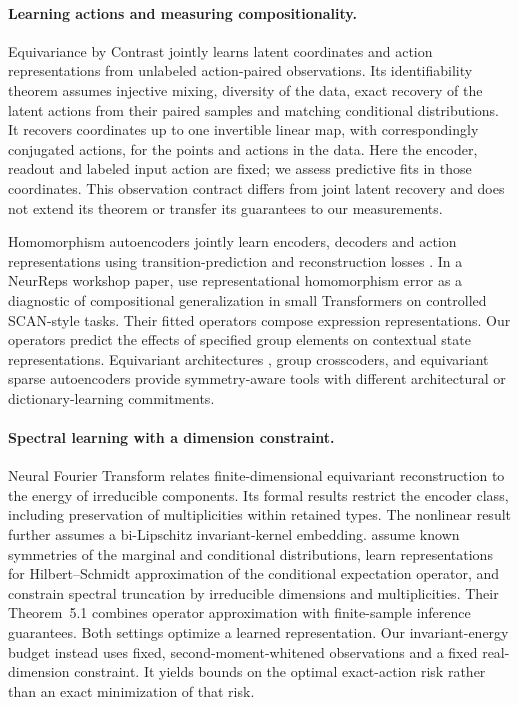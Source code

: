\paragraph{Learning actions and measuring compositionality.}
Equivariance by Contrast \citep{schmidt2025equivariance} jointly learns latent coordinates and action representations from unlabeled action-paired observations. Its identifiability theorem assumes injective mixing, diversity of the data, exact recovery of the latent actions from their paired samples and matching conditional distributions. It recovers coordinates up to one invertible linear map, with correspondingly conjugated actions, for the points and actions in the data. Here the encoder, readout and labeled input action are fixed; we assess predictive fits in those coordinates. This observation contract differs from joint latent recovery and does not extend its theorem or transfer its guarantees to our measurements.

Homomorphism autoencoders jointly learn encoders, decoders and action representations using transition-prediction and reconstruction losses \citep{keurti2023homomorphism}. In a NeurReps workshop paper, \citet{an2026homomorphism} use representational homomorphism error as a diagnostic of compositional generalization in small Transformers on controlled SCAN-style tasks. Their fitted operators compose expression representations. Our operators predict the effects of specified group elements on contextual state representations. Equivariant architectures \citep{cohen2016group,kondor2018generalization,weiler2019general}, group crosscoders, and equivariant sparse autoencoders \citep{gorton2024group,erdogan2025group} provide symmetry-aware tools with different architectural or dictionary-learning commitments.

\paragraph{Spectral learning with a dimension constraint.}
Neural Fourier Transform \citep[Theorems~4.2 and~C.13]{koyama2024fourier} relates finite-dimensional equivariant reconstruction to the energy of irreducible components. Its formal results restrict the encoder class, including preservation of multiplicities within retained types. The nonlinear result further assumes a bi-Lipschitz invariant-kernel embedding. \citet[Sections~3--5 and Appendix~J.2]{ordonez2026inference} assume known symmetries of the marginal and conditional distributions, learn representations for Hilbert--Schmidt approximation of the conditional expectation operator, and constrain spectral truncation by irreducible dimensions and multiplicities. Their Theorem~5.1 combines operator approximation with finite-sample inference guarantees. Both settings optimize a learned representation. Our invariant-energy budget instead uses fixed, second-moment-whitened observations and a fixed real-dimension constraint. It yields bounds on the optimal exact-action risk rather than an exact minimization of that risk.

